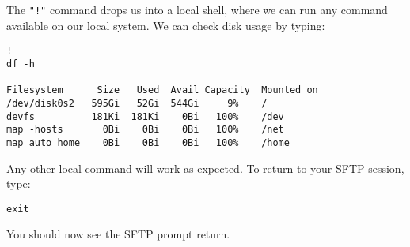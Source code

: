 \documentclass{article}
\begin{document}
The \verb+"!"+ command drops us into a local shell, where we can run any command available on our local system. We can check disk usage by typing:
\begin{verbatim}
!
df -h

Filesystem      Size   Used  Avail Capacity  Mounted on
/dev/disk0s2   595Gi   52Gi  544Gi     9%    /
devfs          181Ki  181Ki    0Bi   100%    /dev
map -hosts       0Bi    0Bi    0Bi   100%    /net
map auto_home    0Bi    0Bi    0Bi   100%    /home
\end{verbatim}
Any other local command will work as expected. To return to your SFTP session, type:
\begin{verbatim}
exit 
\end{verbatim}


You should now see the SFTP prompt return.
\end{document}
